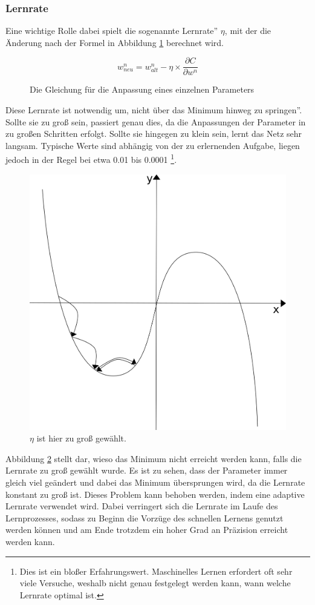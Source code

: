 \documentclass[11pt]{article}
\begin{document}
\subsubsection{Lernrate}
Eine wichtige Rolle dabei spielt die sogenannte \glqq Lernrate'' $\eta$, mit der die Änderung nach der Formel in Abbildung \ref{Learning_Rate_Function} berechnet wird.
\begin{figure}[h]
	\begin{equation*}
	w^n_{neu}=w^n_{alt}-\eta\times\frac{\partial C}{\partial w^n}
	\end{equation*}
	\caption{Die Gleichung für die Anpassung eines einzelnen Parameters}
	\label{Learning_Rate_Function}
\end{figure}
\newline
Diese Lernrate ist notwendig um, nicht über das Minimum \glqq hinweg zu springen''. Sollte sie zu groß sein, passiert genau dies, da die Anpassungen der Parameter in zu großen Schritten erfolgt. Sollte sie hingegen zu klein sein, lernt das Netz sehr langsam. Typische Werte sind abhängig von der zu erlernenden Aufgabe, liegen jedoch in der Regel bei etwa 0.01 bis 0.0001 \footnote{Dies ist ein bloßer Erfahrungswert. Maschinelles Lernen erfordert oft sehr viele Versuche, weshalb nicht genau festgelegt werden kann, wann welche Lernrate optimal ist.}.
\begin{figure}[h]
	\begin{center}
		\includegraphics[width=0.5\linewidth]{../graphics/gdf_big_lr.png}
	\end{center}
	\caption{$\eta$ ist hier zu groß gewählt.}
	\label{Learning_Rate_Graphic}
\end{figure}
\newline
Abbildung \ref{Learning_Rate_Graphic} stellt dar, wieso das Minimum nicht erreicht werden kann, falls die Lernrate zu groß gewählt wurde. Es ist zu sehen, dass der Parameter immer gleich viel geändert und dabei das Minimum übersprungen wird, da die Lernrate konstant zu groß ist. Dieses Problem kann behoben werden, indem eine adaptive Lernrate verwendet wird. Dabei verringert sich die Lernrate im Laufe des Lernprozesses, sodass zu Beginn die Vorzüge des schnellen Lernens genutzt werden können und am Ende trotzdem ein hoher Grad an Präzision erreicht werden kann.
\end{document}
